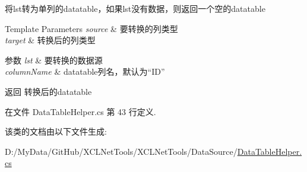 将lst转为单列的datatable，如果lst没有数据，则返回一个空的datatable 


\begin{DoxyTemplParams}{Template Parameters}
{\em source} & 要转换的列类型\\
\hline
{\em target} & 转换后的列类型\\
\hline
\end{DoxyTemplParams}

\begin{DoxyParams}{参数}
{\em lst} & 要转换的数据源\\
\hline
{\em column\+Name} & datatable列名，默认为“\+I\+D”\\
\hline
\end{DoxyParams}
\begin{DoxyReturn}{返回}
转换后的datatable
\end{DoxyReturn}


在文件 Data\+Table\+Helper.\+cs 第 43 行定义.



该类的文档由以下文件生成\+:\begin{DoxyCompactItemize}
\item 
D\+:/\+My\+Data/\+Git\+Hub/\+X\+C\+L\+Net\+Tools/\+X\+C\+L\+Net\+Tools/\+Data\+Source/\hyperlink{_data_table_helper_8cs}{Data\+Table\+Helper.\+cs}\end{DoxyCompactItemize}
